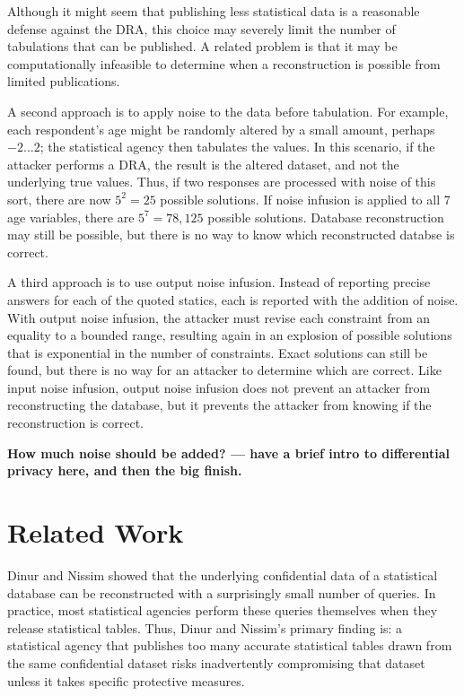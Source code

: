 \documentclass[runningheads]{llncs}
\begin{document}
Although it might seem that publishing less statistical data is a
reasonable defense against the DRA, this choice may severely limit the number
of tabulations that can be published. A
related problem is that it may be computationally infeasible to
determine when a reconstruction is possible from limited publications.

A second approach is to apply noise to the data before
tabulation. For example, each respondent's age might be randomly
altered by a small amount, perhaps $-2 \ldots 2$; 
the statistical agency then tabulates the values. 
In this scenario, if the attacker performs a DRA, the result is the altered dataset, and not the underlying true values. Thus, if two responses
are processed with noise of this sort, there are now $5^2 = 25$
possible solutions. If noise infusion is applied to all 7 age
variables, there are $5^{7}=78,125$ possible
solutions. Database reconstruction may still be possible, but there is no
way to know which reconstructed databse is correct. 

A third approach is to use output noise infusion. Instead of reporting
precise answers for each of the quoted statics, each is reported with
the addition of noise.  With output noise infusion, the attacker must
revise each constraint from an equality to a bounded range, resulting
again in an explosion of possible solutions that is exponential in the
number of constraints. Exact solutions can still be found, but there
is no way for an attacker to determine which are correct.  Like input
noise infusion, output noise infusion does not prevent an attacker
from reconstructing the database, but it prevents the attacker from
knowing if the reconstruction is correct.

\textbf{How much noise should be added? --- have a brief intro to
  differential privacy here, and then the big finish.}

\section{Related Work}

Dinur and Nissim\cite{noise} showed that the underlying
confidential data of a statistical database can be reconstructed with
a surprisingly small number of queries. In practice, most statistical
agencies perform these queries themselves when they release
statistical tables. Thus, Dinur and Nissim's primary finding
is: a statistical agency that publishes too many accurate statistical
tables drawn from the same confidential dataset risks inadvertently
compromising that dataset unless it takes specific protective measures.
\end{document}
